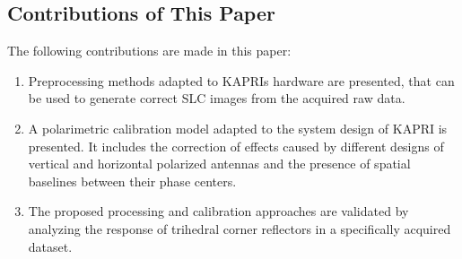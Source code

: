 \subsection{Contributions of This Paper}
The following contributions are made in this paper:
\begin{enumerate}
	\item Preprocessing methods adapted to KAPRIs hardware are presented, that can be used to generate correct SLC images from the acquired raw data.
	\item A polarimetric calibration model adapted to the system design of KAPRI is presented. It includes the correction of effects caused by different designs of vertical and horizontal polarized antennas and the presence of spatial baselines between their phase centers.
	\item The proposed processing and calibration approaches are validated by analyzing the response of trihedral corner reflectors in a specifically acquired dataset.
\end{enumerate}
